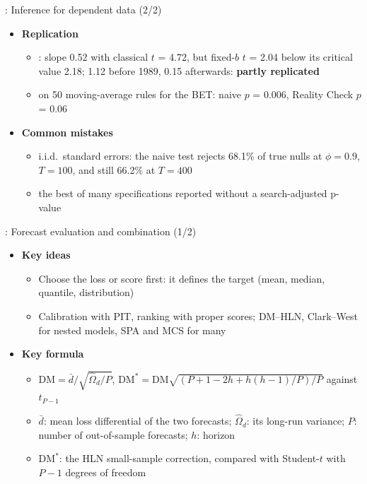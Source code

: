 \begin{frame}{: Inference for dependent data (2/2)}
\itemsize{\small}
\begin{itemize}
    \item \textbf{Replication}
    \begin{itemize}
        \item {}: slope 0.52 with classical $t$ = 4.72, but fixed-$b$ $t$ = 2.04 below its critical value 2.18; 1.12 before 1989, 0.15 afterwards: \textbf{partly replicated}
        \item {} on 50 moving-average rules for the BET: naive $p$ = 0.006, Reality Check $p$ = 0.06
    \end{itemize}
    \item \textbf{Common mistakes}
    \begin{itemize}
        \item i.i.d.\ standard errors: the naive test rejects 68.1\% of true nulls at $\phi = 0.9$, $T = 100$, and still 66.2\% at $T = 400$
        \item the best of many specifications reported without a search-adjusted p-value
    \end{itemize}
\end{itemize}
\end{frame}

\begin{frame}{: Forecast evaluation and combination (1/2)}
\itemsize{\footnotesize}
\begin{itemize}
    \item \textbf{Key ideas}
    \begin{itemize}
        \item Choose the loss or score first: it defines the target (mean, median, quantile, distribution)
        \item Calibration with PIT, ranking with proper scores; DM--HLN, Clark--West for nested models, SPA and MCS for many
    \end{itemize}
    \item \textbf{Key formula}
    \begin{itemize}
        \item $\mathrm{DM} = \bar d/\sqrt{\hat\Omega_d/P}$, $\mathrm{DM}^* = \mathrm{DM}\sqrt{(P + 1 - 2h + h(h - 1)/P)/P}$ against $t_{P-1}$
        \item $\bar d$: mean loss differential of the two forecasts; $\hat\Omega_d$: its long-run variance; $P$: number of out-of-sample forecasts; $h$: horizon
        \item $\mathrm{DM}^*$: the HLN small-sample correction, compared with Student-$t$ with $P - 1$ degrees of freedom
    \end{itemize}
\end{itemize}
\end{frame}

